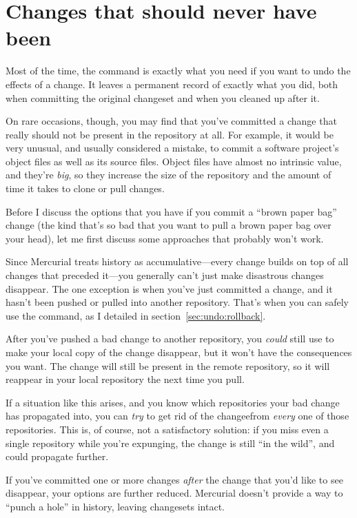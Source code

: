 \section{Changes that should never have been}
\label{sec:undo:aaaiiieee}

Most of the time, the  command is exactly what you need
if you want to undo the effects of a change.  It leaves a permanent
record of exactly what you did, both when committing the original
changeset and when you cleaned up after it.

On rare occasions, though, you may find that you've committed a change
that really should not be present in the repository at all.  For
example, it would be very unusual, and usually considered a mistake,
to commit a software project's object files as well as its source
files.  Object files have almost no intrinsic value, and they're
\emph{big}, so they increase the size of the repository and the amount
of time it takes to clone or pull changes.

Before I discuss the options that you have if you commit a ``brown
paper bag'' change (the kind that's so bad that you want to pull a
brown paper bag over your head), let me first discuss some approaches
that probably won't work.

Since Mercurial treats history as accumulative---every change builds
on top of all changes that preceded it---you generally can't just make
disastrous changes disappear.  The one exception is when you've just
committed a change, and it hasn't been pushed or pulled into another
repository.  That's when you can safely use the 
command, as I detailed in section~\ref{sec:undo:rollback}.

After you've pushed a bad change to another repository, you
\emph{could} still use  to make your local copy of the
change disappear, but it won't have the consequences you want.  The
change will still be present in the remote repository, so it will
reappear in your local repository the next time you pull.

If a situation like this arises, and you know which repositories your
bad change has propagated into, you can \emph{try} to get rid of the
changeefrom \emph{every} one of those repositories.  This is, of
course, not a satisfactory solution: if you miss even a single
repository while you're expunging, the change is still ``in the
wild'', and could propagate further.

If you've committed one or more changes \emph{after} the change that
you'd like to see disappear, your options are further reduced.
Mercurial doesn't provide a way to ``punch a hole'' in history,
leaving changesets intact.

